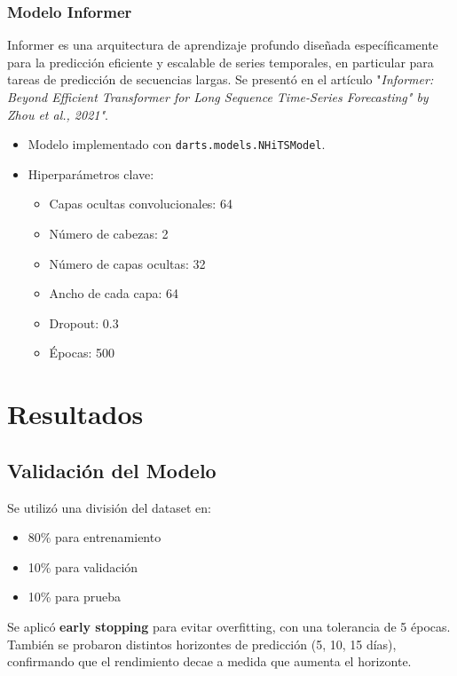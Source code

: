 \documentclass[12pt]{article}
\begin{document}
\subsubsection{Modelo Informer}

Informer es una arquitectura de aprendizaje profundo diseñada específicamente para  la predicción eficiente y escalable de series temporales, en particular para tareas de predicción de secuencias largas. Se presentó en el artículo "\textit{Informer: Beyond Efficient Transformer for Long Sequence Time-Series Forecasting" by Zhou et al., 2021"}.


\begin{itemize}
\item Modelo implementado con \texttt{darts.models.NHiTSModel}.
\item Hiperparámetros clave:
\begin{itemize}
\item Capas ocultas convolucionales: 64
\item Número de cabezas: 2
\item Número de capas ocultas: 32
\item Ancho de cada capa: 64
\item Dropout: 0.3
\item Épocas: 500
\end{itemize}
\end{itemize}


\newpage
\section{Resultados}
\label{sec:resultados}

\subsection{Validación del Modelo}

Se utilizó una división del dataset en:
\begin{itemize}
\item 80\% para entrenamiento
\item 10\% para validación
\item 10\% para prueba
\end{itemize}

Se aplicó \textbf{early stopping} para evitar overfitting, con una tolerancia de 5 épocas. También se probaron distintos horizontes de predicción (5, 10, 15 días), confirmando que el rendimiento decae a medida que aumenta el horizonte.
\end{document}
